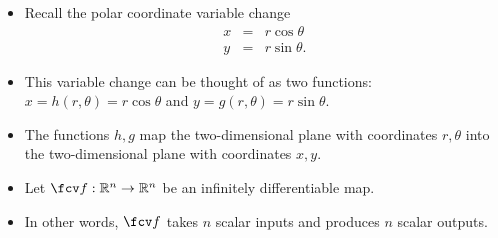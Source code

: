 \begin{frame}
\begin{itemize}
\item Recall the polar coordinate variable change
\[
\begin{array}{rcl}
x&=&r\cos \theta \\
y&=&r\sin \theta.
\end{array}
\]
\item<2-> This variable change can be thought of as two functions: $x=h(r, \theta)= r\cos \theta $ and $y=g(r,\theta)=r\sin \theta$.
\item<3-> The functions $h,g$ map the two-dimensional plane with coordinates $r,\theta$  into the two-dimensional plane with coordinates $x,y$.
\item<4-> Let $\fcv f:\mathbb R^n\to \mathbb R^n$ be an infinitely differentiable map.
\item<5-> In other words, $\fcv f$ takes $n$ scalar inputs and produces $n$ scalar outputs.
\end{itemize}
\end{frame}